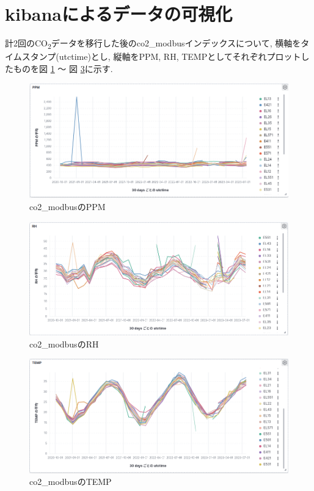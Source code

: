\section{kibanaによるデータの可視化}

計2回のCO\textsubscript{2}データを移行した後のco2\_modbusインデックスについて, 横軸をタイムスタンプ(utctime)とし, 縦軸をPPM, RH, TEMPとしてそれぞれプロットしたものを図 \ref{p12} 〜 図 \ref{p14}に示す.

\begin{figure}
    \begin{center}
        \includegraphics[width=160mm]{sotu/figure/ppm.png}
        \caption{co2\_modbusのPPM}
        \label{p12}
    \end{center}
\end{figure}

\begin{figure}
    \begin{center}
        \includegraphics[width=160mm]{sotu/figure/rh.png}
        \caption{co2\_modbusのRH}
        \label{p13}
    \end{center}
\end{figure}

\begin{figure}
    \begin{center}
        \includegraphics[width=160mm]{sotu/figure/temp.png}
        \caption{co2\_modbusのTEMP}
        \label{p14}
    \end{center}
\end{figure}

